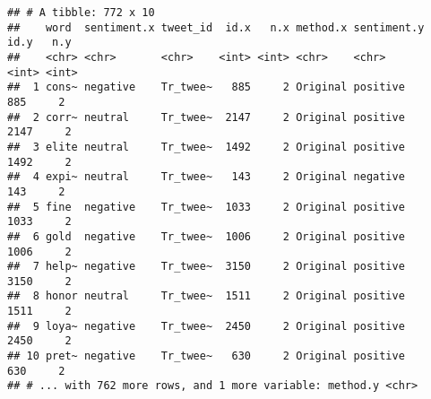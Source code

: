 \documentclass[
]{article}
\newenvironment{Shaded}{\begin{snugshade}}{\end{snugshade}}
\newcommand{\CommentTok}[1]{\textcolor[rgb]{0.56,0.35,0.01}{\textit{#1}}}
\newcommand{\DataTypeTok}[1]{\textcolor[rgb]{0.13,0.29,0.53}{#1}}
\newcommand{\KeywordTok}[1]{\textcolor[rgb]{0.13,0.29,0.53}{\textbf{#1}}}
\newcommand{\NormalTok}[1]{#1}
\newcommand{\OperatorTok}[1]{\textcolor[rgb]{0.81,0.36,0.00}{\textbf{#1}}}
\newcommand{\OtherTok}[1]{\textcolor[rgb]{0.56,0.35,0.01}{#1}}
\newcommand{\StringTok}[1]{\textcolor[rgb]{0.31,0.60,0.02}{#1}}
\begin{document}
\begin{Shaded}
\end{Shaded}

\begin{verbatim}
## # A tibble: 772 x 10
##    word  sentiment.x tweet_id  id.x   n.x method.x sentiment.y  id.y   n.y
##    <chr> <chr>       <chr>    <int> <int> <chr>    <chr>       <int> <int>
##  1 cons~ negative    Tr_twee~   885     2 Original positive      885     2
##  2 corr~ neutral     Tr_twee~  2147     2 Original positive     2147     2
##  3 elite neutral     Tr_twee~  1492     2 Original positive     1492     2
##  4 expi~ neutral     Tr_twee~   143     2 Original negative      143     2
##  5 fine  negative    Tr_twee~  1033     2 Original positive     1033     2
##  6 gold  negative    Tr_twee~  1006     2 Original positive     1006     2
##  7 help~ negative    Tr_twee~  3150     2 Original positive     3150     2
##  8 honor neutral     Tr_twee~  1511     2 Original positive     1511     2
##  9 loya~ negative    Tr_twee~  2450     2 Original positive     2450     2
## 10 pret~ negative    Tr_twee~   630     2 Original positive      630     2
## # ... with 762 more rows, and 1 more variable: method.y <chr>
\end{verbatim}
\end{document}

